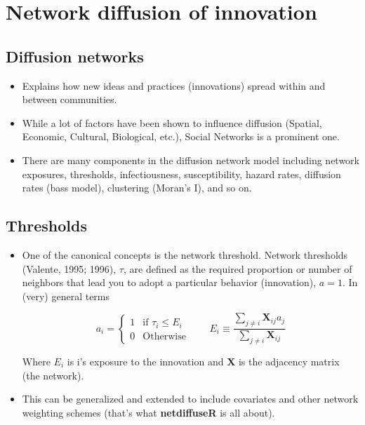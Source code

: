 \documentclass[
]{book}
\begin{document}
\hypertarget{network-diffusion-of-innovation}{%
\section{Network diffusion of innovation}\label{network-diffusion-of-innovation}}

\hypertarget{diffusion-networks}{%
\subsection{Diffusion networks}\label{diffusion-networks}}

\begin{itemize}
\item
  Explains how new ideas and practices (innovations) spread within and between
  communities.
\item
  While a lot of factors have been shown to influence diffusion (Spatial,
  Economic, Cultural, Biological, etc.), Social Networks is a prominent one.
\item
  There are many components in the diffusion network model including network exposures, thresholds, infectiousness, susceptibility, hazard rates, diffusion rates (bass model), clustering (Moran's I), and so on.
\end{itemize}

\hypertarget{thresholds}{%
\subsection{Thresholds}\label{thresholds}}

\begin{itemize}
\item
  One of the canonical concepts is the network threshold. Network thresholds (Valente, 1995; 1996), \(\tau\), are defined as the required proportion or number of neighbors that lead you to adopt a particular behavior (innovation), \(a=1\). In (very) general terms

  \[
  a_i = \left\{\begin{array}{ll}
  1 &\mbox{if } \tau_i\leq E_i \\
  0 & \mbox{Otherwise}
  \end{array}\right. \qquad
  E_i \equiv \frac{\sum_{j\neq i}\mathbf{X}_{ij}a_j}{\sum_{j\neq i}\mathbf{X}_{ij}}
  \]

  Where \(E_i\) is i's exposure to the innovation and \(\mathbf{X}\) is the adjacency matrix (the network).
\item
  This can be generalized and extended to include covariates and other network weighting schemes (that's what \textbf{netdiffuseR} is all about).
\end{itemize}
\end{document}

